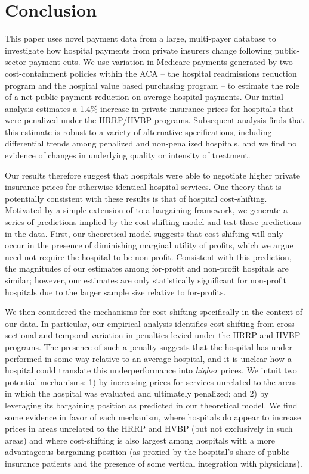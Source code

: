 \documentclass[12pt]{article}
\begin{document}
\section{Conclusion}
\label{sec:Conclusion}
This paper uses novel payment data from a large, multi-payer database to investigate how hospital payments from private insurers change following public-sector payment cuts. We use variation in Medicare payments generated by two cost-containment policies within the ACA -- the hospital readmissions reduction program and the hospital value based purchasing program -- to estimate the role of a net public payment reduction on average hospital payments. Our initial analysis estimates a 1.4\% increase in private insurance prices for hospitals that were penalized under the HRRP/HVBP programs. Subsequent analysis finds that this estimate is robust to a variety of alternative specifications, including differential trends among penalized and non-penalized hospitals, and we find no evidence of changes in underlying quality or intensity of treatment.

Our results therefore suggest that hospitals were able to negotiate higher private insurance prices for otherwise identical hospital services. One theory that is potentially consistent with these results is that of hospital cost-shifting. Motivated by a simple extension of \cite{dranove1988} to a bargaining framework, we generate a series of predictions implied by the cost-shifting model and test these predictions in the data. First, our theoretical model suggests that cost-shifting will only occur in the presence of diminishing marginal utility of profits, which we argue need not require the hospital to be non-profit. Consistent with this prediction, the magnitudes of our estimates among for-profit and non-profit hospitals are similar; however, our estimates are only statistically significant for non-profit hospitals due to the larger sample size relative to for-profits.

We then considered the mechanisms for cost-shifting specifically in the context of our data. In particular, our empirical analysis identifies cost-shifting from cross-sectional and temporal variation in penalties levied under the HRRP and HVBP programs. The presence of such a penalty suggests that the hospital has under-performed in some way relative to an average hospital, and it is unclear how a hospital could translate this underperformance into \textit{higher} prices. We intuit two potential mechanisms: 1) by increasing prices for services unrelated to the areas in which the hospital was evaluated and ultimately penalized; and 2) by leveraging its bargaining position as predicted in our theoretical model. We find some evidence in favor of each mechanism, where hospitals do appear to increase prices in areas unrelated to the HRRP and HVBP (but not exclusively in such areas) and where cost-shifting is also largest among hospitals with a more advantageous bargaining position (as proxied by the hospital's share of public insurance patients and the presence of some vertical integration with physicians).
\end{document}
